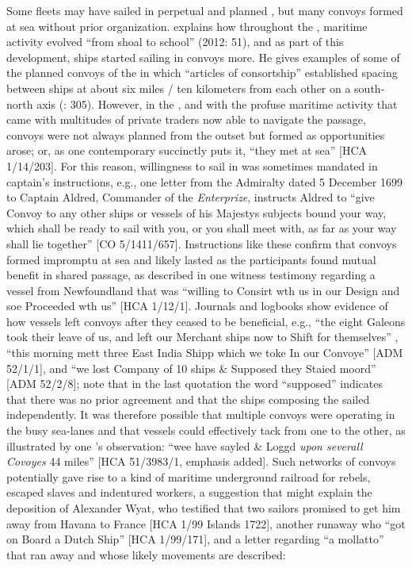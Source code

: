 Some fleets may have sailed in perpetual and planned , but many convoys formed at sea without prior organization. \citeauthor{Bicheno2012} explains how throughout the , maritime activity evolved “from shoal to school” (2012: 51), and as part of this development, ships started sailing in convoys more. He gives examples of some of the planned convoys of the  in which “articles of consortship” established spacing between ships at about six miles / ten kilometers from each other on a south-north axis (\citealt{Bicheno2012}: 305). However, in the , and with the profuse maritime activity that came with multitudes of private traders now able to navigate the  passage, convoys were not always planned from the outset but formed as opportunities arose; or, as one contemporary succinctly puts it, “they met at sea” [HCA 1/14/203]. For this reason, willingness to sail in  was sometimes mandated in captain’s instructions, e.g., one letter from the Admiralty dated 5 December {1699} to Captain Aldred, Commander of the \textit{ Enterprize}, instructs Aldred to “give Convoy to any other ships or vessels of his Majestys subjects bound your way, which shall be ready to sail with you, or you shall meet with, as far as your way shall lie together” [CO 5/1411/657]. Instructions like these confirm that convoys formed impromptu at sea and likely lasted as the participants found mutual benefit in shared passage, as described in one witness testimony regarding a vessel from Newfoundland that was “willing to Consirt wth us in our Design and soe Proceeded wth us” [HCA 1/12/1]. Journals and logbooks show evidence of how vessels left convoys after they ceased to be beneficial, e.g., “the eight Galeons took their leave of us, and left our Merchant ships now to Shift for themselves” \citep[15]{Gage1648}, “this morning mett three East India Shipp which we toke In our Convoye” [ADM 52/1/1], and “we lost Company of 10 ships \& Supposed they Staied moord” [ADM 52/2/8]; note that in the last quotation the word “supposed” indicates that there was no prior agreement and that the ships composing the  sailed independently. It was therefore possible that multiple convoys were operating in the busy sea-lanes and that vessels could effectively tack from one to the other, as illustrated by one ’s observation: “wee have sayled \& Loggd \textit{upon severall Covoyes} 44 miles” [HCA 51/3983/1, emphasis added].  Such networks of convoys potentially gave rise to a kind of maritime underground railroad for rebels, escaped slaves and indentured workers, a suggestion that might explain the deposition of Alexander Wyat, who testified that two sailors promised to get him away from Havana to France [HCA 1/99  Islands 1722], another runaway who “got on Board a Dutch Ship” [HCA 1/99/171], and a letter regarding “a mollatto” that ran away and whose likely movements are described:

